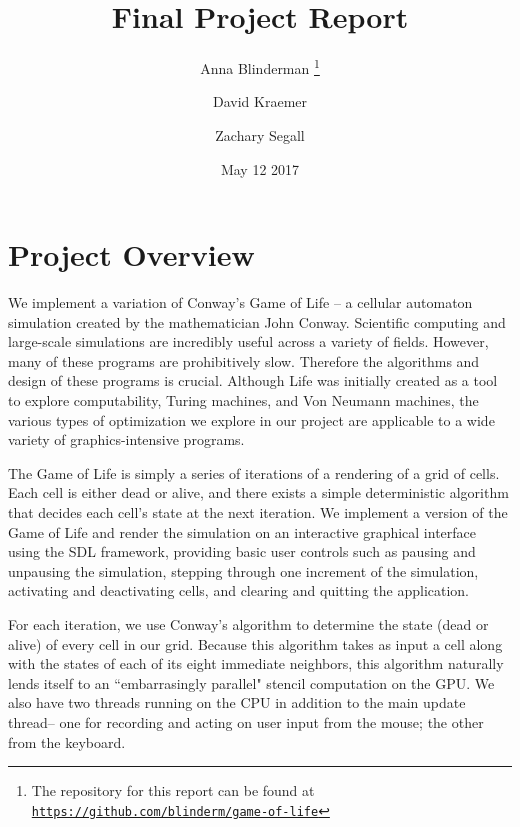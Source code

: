 \documentclass[onecolumn,12pt]{IEEEtran}
\title{Final Project Report}
\author{Anna Blinderman%
  \thanks{The repository for this report can be found at \href{https://github.com/blinderm/game-of-life} {\texttt{https://github.com/blinderm/game-of-life}}}}
\author{David Kraemer}
\author{Zachary Segall}
\affil{CSC 213: Operating Systems and Parallel Algorithms (Curtsinger)}
\date{May 12 2017}
\begin{document}
  \maketitle

  \section{Project Overview}

  We implement a variation of Conway's Game of Life -- a cellular automaton
  simulation created by the mathematician John Conway.  Scientific computing and
  large-scale simulations are incredibly useful across a variety of fields.
  However, many of these programs are prohibitively slow. Therefore the
  algorithms and design of these programs is crucial. Although Life was initially
  created as a tool to explore computability, Turing machines, and Von Neumann
  machines, the various types of optimization we explore in our project are
  applicable to a wide variety of graphics-intensive programs. 

  The Game of Life is simply a series of iterations of a rendering of a grid of
  cells. Each cell is either dead or alive, and there exists a simple
  deterministic algorithm that decides each cell's state at the next iteration.
  We implement a version of the Game of Life and render the simulation on an
  interactive graphical interface using the SDL framework, providing basic user
  controls such as pausing and unpausing the simulation, stepping through one
  increment of the simulation, activating and deactivating cells, and clearing
  and quitting the application.

  For each iteration, we use Conway's algorithm to determine the state (dead or
  alive) of every cell in our grid. Because this algorithm takes as input a cell
  along with the states of each of its eight immediate neighbors, this algorithm
  naturally lends itself to an ``embarrasingly parallel" stencil computation on
  the GPU. We also have two threads running on the CPU in addition to the main
  update thread-- one for recording and acting on user input from the mouse; the
  other from the keyboard. 
\end{document}
